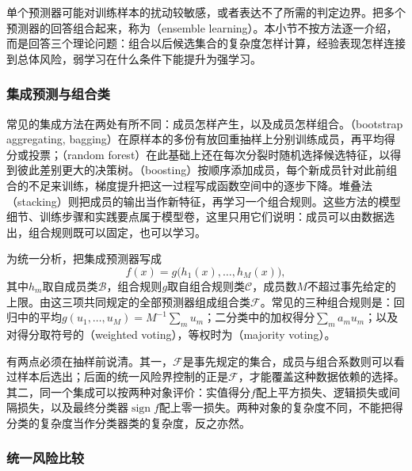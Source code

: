 单个预测器可能对训练样本的扰动较敏感，或者表达不了所需的判定边界。把多个预测器的回答组合起来，称为（ensemble learning）。本小节不按方法逐一介绍，而是回答三个理论问题：组合以后候选集合的复杂度怎样计算，经验表现怎样连接到总体风险，弱学习在什么条件下能提升为强学习。

\subsubsection{集成预测与组合类}

常见的集成方法在两处有所不同：成员怎样产生，以及成员怎样组合。（bootstrap aggregating, bagging）在原样本的多份有放回重抽样上分别训练成员，再平均得分或投票；（random forest）在此基础上还在每次分裂时随机选择候选特征，以得到彼此差别更大的决策树。（boosting）按顺序添加成员，每个新成员针对此前组合的不足来训练，梯度提升把这一过程写成函数空间中的逐步下降。堆叠法（stacking）则把成员的输出当作新特征，再学习一个组合规则。这些方法的模型细节、训练步骤和实践要点属于模型卷，这里只用它们说明：成员可以由数据选出，组合规则既可以固定，也可以学习。

为统一分析，把集成预测器写成
\[
 f(x)=g\bigl(h_1(x),\ldots,h_M(x)\bigr),
\]
其中$h_m$取自成员类$\mathcal B$，组合规则$g$取自组合规则类$\mathcal C$，成员数$M$不超过事先给定的上限。由这三项共同规定的全部预测器组成组合类$\mathcal F$。常见的三种组合规则是：回归中的平均$g(u_1,\ldots,u_M)=M^{-1}\sum_mu_m$；二分类中的加权得分$\sum_ma_mu_m$；以及对得分取符号的（weighted voting），等权时为（majority voting）。

有两点必须在抽样前说清。其一，$\mathcal F$是事先规定的集合，成员与组合系数则可以看过样本后选出；后面的统一风险界控制的正是$\mathcal F$，才能覆盖这种数据依赖的选择。其二，同一个集成可以按两种对象评价：实值得分$f$配上平方损失、逻辑损失或间隔损失，以及最终分类器$\operatorname{sign}f$配上零一损失。两种对象的复杂度不同，不能把得分类的复杂度当作分类器类的复杂度，反之亦然。

\subsubsection{统一风险比较}


